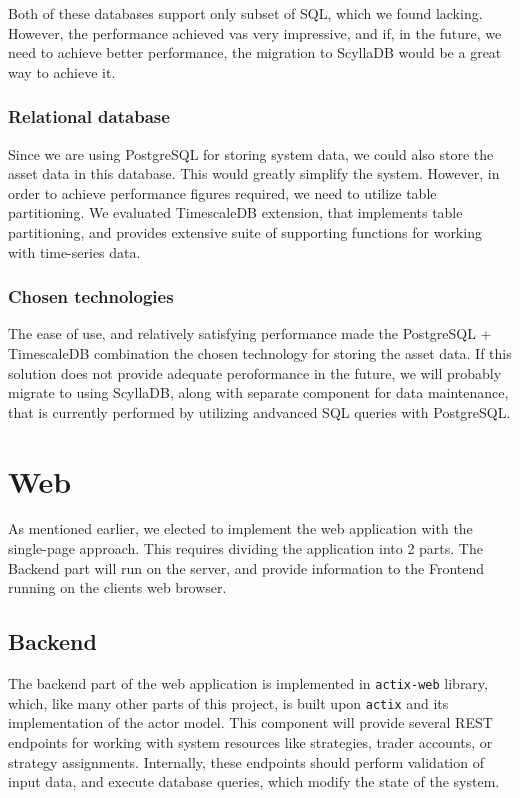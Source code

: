 Both of these databases support only subset of SQL, which we found lacking. However, the
performance achieved vas very impressive, and if, in the future, we need to achieve better performance,
the migration to ScyllaDB would be a great way to achieve it.
\subsubsection{Relational database}
Since we are using PostgreSQL for storing system data, we could also store the asset data in this database.
This would greatly simplify the system. However, in order to achieve performance figures required, we need to
utilize table partitioning. We evaluated TimescaleDB extension, that implements table partitioning,
and provides extensive suite of supporting functions for working with time-series data.

\subsubsection{Chosen technologies}
The ease of use, and relatively satisfying performance made the PostgreSQL + TimescaleDB combination the
chosen technology for storing the asset data. If this solution does not provide adequate peroformance
in the future, we will probably migrate to using ScyllaDB, along with separate component for data maintenance,
that is currently performed by utilizing andvanced SQL queries with PostgreSQL.


\section{Web}
As mentioned earlier, we elected to implement the web application with the single-page approach. This requires dividing
the application into 2 parts. The Backend part will run on the server, and provide information to the Frontend running on the
clients web browser.

\subsection{Backend}
The backend part of the web application is implemented in \verb|actix-web| library, which, like many other parts of this project,
is built upon \verb|actix| and its implementation of the actor model. This component will provide several REST endpoints
for working with system resources like strategies, trader accounts, or strategy assignments. Internally,
these endpoints should perform validation of input data, and execute database queries, which modify the state of the system.

